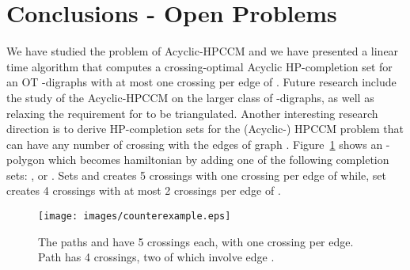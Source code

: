 \documentclass{myllncs-mixalis}
\begin{document}
\section{Conclusions - Open Problems}
We have studied the problem of Acyclic-HPCCM and we have presented a
linear time algorithm that computes a crossing-optimal Acyclic
HP-completion set for an OT -digraphs  with at most one
crossing per edge of . Future research include the study of the
Acyclic-HPCCM on the larger class of -digraphs, as well as
relaxing the requirement for  to be triangulated. Another
interesting research direction is to derive HP-completion sets for
the (Acyclic-) HPCCM problem that can have any number of crossing
with the edges of graph . Figure~{\ref{fig:cntrexmpl}} shows an
-polygon which becomes hamiltonian by adding one of the
following completion sets: ,  or
. Sets  and  creates 5 crossings
with one crossing per edge of  while, set  creates 4 crossings
with at most 2 crossings per edge of .

\begin{figure}[htb]
    \begin{minipage}{\textwidth}
    \centering
    \texttt{[image: images/counterexample.eps]}
    \caption{The paths  and
     have 5 crossings each, with one crossing per edge.
    Path
     has 4 crossings,
    two of which involve edge .}
    \label{fig:cntrexmpl}
  \end{minipage}
\end{figure}
\end{document}
